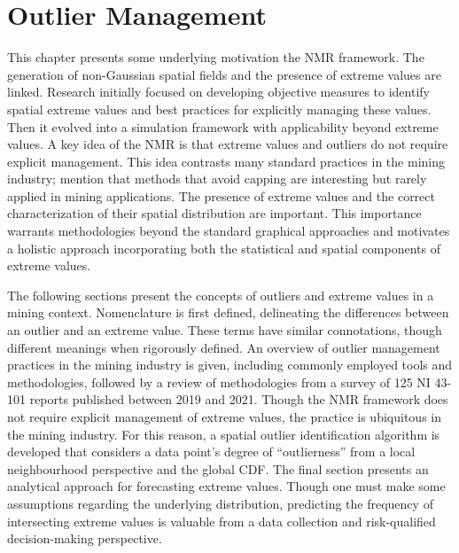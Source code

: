 
\chapter{Outlier Management}
\label{ch:02outlier}

This chapter presents some underlying motivation the \gls{NMR} framework. The generation of non-Gaussian spatial fields and the presence of extreme values are linked. Research initially focused on developing objective measures to identify spatial extreme values and best practices for explicitly managing these values. Then it evolved into a simulation framework with applicability beyond extreme values. A key idea of the \gls{NMR} is that extreme values and outliers do not require explicit management. This idea contrasts many standard practices in the mining industry; \cite{dutaut2021new} mention that methods that avoid capping are interesting but rarely applied in mining applications. The presence of extreme values and the correct characterization of their spatial distribution are important. This importance warrants methodologies beyond the standard graphical approaches \citep{silva2021classification} and motivates a holistic approach incorporating both the statistical and spatial components of extreme values.

The following sections present the concepts of outliers and extreme values in a mining context. Nomenclature is first defined, delineating the differences between an outlier and an extreme value. These terms have similar connotations, though different meanings when rigorously defined. An overview of outlier management practices in the mining industry is given, including commonly employed tools and methodologies, followed by a review of methodologies from a survey of 125 \gls{NI} 43-101 reports published between 2019 and 2021. Though the \gls{NMR} framework does not require explicit management of extreme values, the practice is ubiquitous in the mining industry. For this reason, a spatial outlier identification algorithm is developed that considers a data point's degree of ``outlierness'' from a local neighbourhood perspective and the global \gls{CDF}. The final section presents an analytical approach for forecasting extreme values. Though one must make some assumptions regarding the underlying distribution, predicting the frequency of intersecting extreme values is valuable from a data collection and risk-qualified decision-making perspective.

